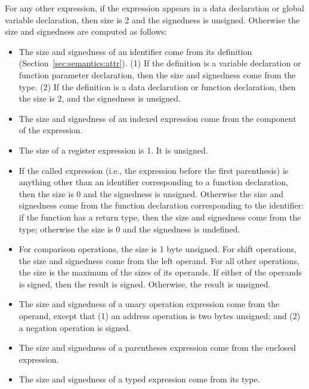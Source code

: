 \documentclass[10pt]{article}
\begin{document}
For any other expression, if the expression appears in a data
declaration or global variable declaration, then size is 2 and the
signedness is unsigned.  Otherwise the size and signedness are
computed as follows:
%
\begin{itemize}
%
\item {} The size and signedness of an identifier
  come from its definition (Section~\ref{sec:semantics:attr}).  (1) If
  the definition is a variable declaration or function parameter
  declaration, then the size and signedness come from the type.  (2)
  If the definition is a data declaration or function declaration,
  then the size is 2, and the signedness is unsigned.
%
\item {} The size and signedness of an
  indexed expression come from the  component of the
  expression.
%
\item {} The size of a register expression
  is 1.  It is unsigned.
%
\item {} If the called expression (i.e., the
  expression before the first parenthesis) is anything other than an
  identifier corresponding to a function declaration, then the size is
  0 and the signedness is unsigned.  Otherwise the size and signedness
  come from the function declaration corresponding to the identifier:
  if the function has a return type, then the size and signedness come
  from the type; otherwise the size is 0 and the signedness is
  undefined.
%
\item {}  For comparison
  operations, the size is 1 byte unsigned.  For shift operations, the
  size and signedness come from the left operand.  For all other
  operations, the size is the maximum of the sizes of its operands.
  If either of the operands is signed, then the result is signed.
  Otherwise, the result is unsigned.
%
\item {} The size and signedness of
  a unary operation expression come from the operand, except that (1)
  an address operation  is two bytes unsigned; and (2) a
  negation operation is signed.
%
\item {} The size and signedness of a
  parentheses expression come from the enclosed expression.
%
\item {} The size and signedness of a typed
  expression come from its type.
%
\end{itemize}
\end{document}
